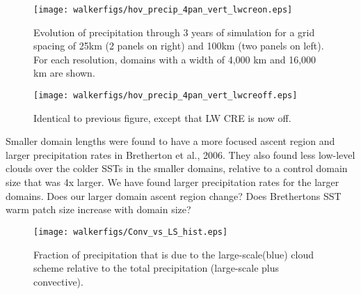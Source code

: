 \documentclass[11pt]{article}   	%
\begin{document}
\begin{figure}
  \texttt{[image: walkerfigs/hov\_precip\_4pan\_vert\_lwcreon.eps]}
  \caption{Evolution of precipitation through 3 years of simulation for a grid spacing of 25km (2 panels on right) and
  100km (two panels on left).  For each resolution, domains with a width of 4,000 km and 16,000 km are shown.}
  \label{fig:domdep}
\end{figure}

\begin{figure}
  \texttt{[image: walkerfigs/hov\_precip\_4pan\_vert\_lwcreoff.eps]}
  \caption{Identical to previous figure, except that LW CRE is now off.}
  \label{fig:domdep_lwoff}
\end{figure}

Smaller domain lengths were found to have a more focused ascent region and larger precipitation rates in Bretherton et al., 2006.
They also found less low-level clouds over the colder SSTs in the smaller domains, relative to a control domain size that was 4x
larger.   We have found larger precipitation rates for the larger domains.  Does our larger domain ascent region change?  Does 
Brethertons SST warm patch size increase with domain size?  

\begin{figure}
  \centering
      \texttt{[image: walkerfigs/Conv\_vs\_LS\_hist.eps]}
  \caption{Fraction of precipitation that is due to the large-scale(blue) cloud scheme relative to the total 
  precipitation (large-scale plus convective).}
  \label{fig:conv_vs_ls}
\end{figure}
\end{document}
